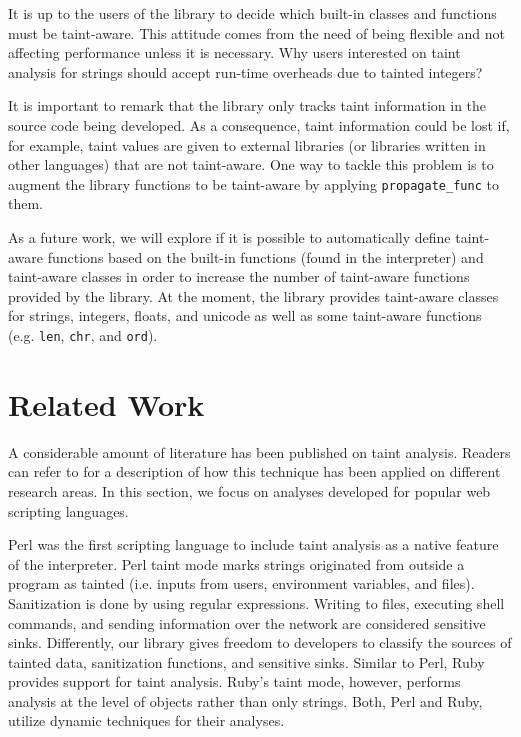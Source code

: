 \documentclass[oribibl]{llncs}
\newcommand{\nametklass}{taint-aware }
\newcommand{\namefunc}{taint-aware }
\begin{document}
It is up to the users of the library 
to decide which built-in classes and functions must be
taint-aware. This attitude comes from the need of being flexible 
and not affecting performance unless it is necessary. 
Why users interested on 
taint analysis for strings should accept 
run-time overheads due to tainted integers? 


It is important to remark that the library only tracks taint information 
in the source code being developed. As a consequence, 
taint information could be lost if, for example, 
taint values are given to external 
libraries (or libraries written in other languages)
that are not taint-aware. 
One way to tackle this problem is to augment the library 
functions to be taint-aware by applying \texttt{propagate\_func} to them. 
 

As a future work, we will explore if 
it is possible to automatically 
define \namefunc functions 
based on the built-in functions (found in the 
interpreter) and \nametklass classes in order to 
increase the number of \nametklass functions provided by the library.
At the moment, the library provides 
\nametklass classes for
strings, integers, floats, and unicode as well as some 
\namefunc functions (e.g. \texttt{len}, \texttt{chr}, 
and \texttt{ord}). 



\section{Related Work}
\label{sec:related}

A considerable amount of literature has been published on 
taint analysis. Readers can refer to 
\cite{Chang:et:al:CCS08} for a description 
of how this technique has been applied 
on different research areas. In this section, we focus on 
analyses developed for popular web scripting languages. 



Perl \cite{Perl} was the first scripting language to include taint analysis
as a native feature of the interpreter. Perl taint mode marks strings
originated from outside a program as tainted (i.e. 
inputs from users, environment variables, and files). Sanitization
is done by using regular expressions. Writing to files, 
executing shell commands, and sending information over the network are
considered sensitive sinks. Differently, 
our library gives freedom to developers 
to classify the sources of 
tainted data, sanitization functions, and sensitive sinks. 
Similar to Perl, Ruby \cite{thomas2004prub} provides 
support for taint analysis. Ruby's taint mode, however, 
performs analysis at the level of
objects rather than only strings. Both, Perl and Ruby, utilize dynamic
techniques for their analyses.
\end{document}
